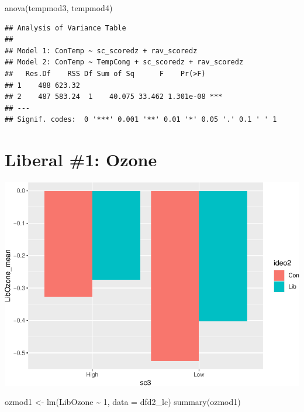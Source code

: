 \documentclass[
]{article}
\newenvironment{Shaded}{\begin{snugshade}}{\end{snugshade}}
\newcommand{\AttributeTok}[1]{\textcolor[rgb]{0.77,0.63,0.00}{#1}}
\newcommand{\DecValTok}[1]{\textcolor[rgb]{0.00,0.00,0.81}{#1}}
\newcommand{\FunctionTok}[1]{\textcolor[rgb]{0.00,0.00,0.00}{#1}}
\newcommand{\NormalTok}[1]{#1}
\newcommand{\OtherTok}[1]{\textcolor[rgb]{0.56,0.35,0.01}{#1}}
\newcommand{\SpecialCharTok}[1]{\textcolor[rgb]{0.00,0.00,0.00}{#1}}
\begin{document}
\begin{Shaded}
\begin{Highlighting}[]
\FunctionTok{anova}\NormalTok{(tempmod3, tempmod4)}
\end{Highlighting}
\end{Shaded}

\begin{verbatim}
## Analysis of Variance Table
## 
## Model 1: ConTemp ~ sc_scoredz + rav_scoredz
## Model 2: ConTemp ~ TempCong + sc_scoredz + rav_scoredz
##   Res.Df    RSS Df Sum of Sq      F    Pr(>F)    
## 1    488 623.32                                  
## 2    487 583.24  1    40.075 33.462 1.301e-08 ***
## ---
## Signif. codes:  0 '***' 0.001 '**' 0.01 '*' 0.05 '.' 0.1 ' ' 1
\end{verbatim}

\hypertarget{liberal-1-ozone}{%
\section{Liberal \#1: Ozone}\label{liberal-1-ozone}}

\includegraphics{desc0829_files/figure-latex/unnamed-chunk-5-1.pdf}

\begin{Shaded}
\begin{Highlighting}[]
\NormalTok{ozmod1 }\OtherTok{\textless{}{-}} \FunctionTok{lm}\NormalTok{(LibOzone }\SpecialCharTok{\textasciitilde{}} \DecValTok{1}\NormalTok{, }\AttributeTok{data =}\NormalTok{ dfd2\_lc)}
\FunctionTok{summary}\NormalTok{(ozmod1)}
\end{Highlighting}
\end{Shaded}
\end{document}
